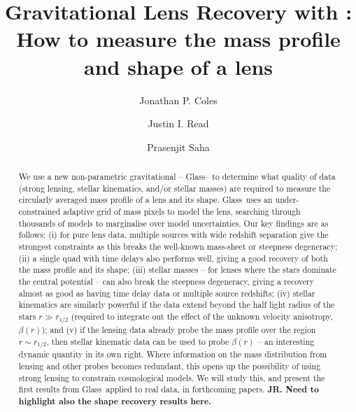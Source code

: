 \documentclass[galley,usenatbib]{mn2e}
\title[\Glass]{Gravitational Lens Recovery with \Glass: How to measure the mass profile and shape of a lens}
\author{%
Jonathan P. Coles 
\and 
Justin I. Read
\and 
Prasenjit Saha 
}
\newcommand{\Glass}{{\sc Glass}}
\begin{document}
\maketitle

\begin{abstract}
We use a new non-parametric gravitational -- \Glass -- to determine what quality of data (strong lensing, stellar kinematics, and/or stellar masses) are required to measure the circularly averaged mass profile of a lens and its shape. \Glass\ uses an under-constrained adaptive grid of mass pixels to model the lens, searching through thousands of models to marginalise over model uncertainties. Our key findings are as follows: (i) for pure lens data, multiple sources with wide redshift separation give the strongest constraints as this breaks the well-known mass-sheet or steepness degeneracy; (ii) a single quad with time delays also performs well, giving a good recovery of both the mass profile and its shape; (iii) stellar masses -- for lenses where the stars dominate the central potential -- can also break the steepness degeneracy, giving a recovery almost as good as having time delay data or multiple source redshifts; (iv) stellar kinematics are similarly powerful if the data extend beyond the half light radius of the stars $r \gg r_{1/2}$ (required to integrate out the effect of the unknown velocity anisotropy, $\beta(r)$); and (v) if the lensing data already probe the mass profile over the region $r \sim r_{1/2}$, then stellar kinematic data can be used to probe $\beta(r)$ -- an interesting dynamic quantity in its own right. Where information on the mass distribution from lensing and other probes becomes redundant, this opens up the possibility of using strong lensing to constrain cosmological models. We will study this, and present the first results from \Glass\ applied to real data, in forthcoming papers.
{\bf JR. Need to highlight also the shape recovery results here.} 
\end{abstract}

\end{document}
